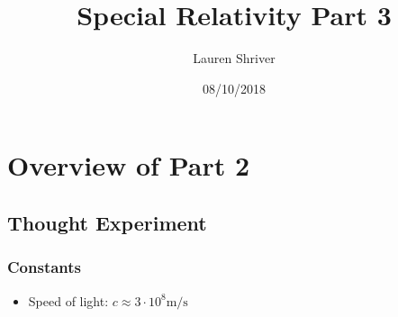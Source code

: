 \documentclass[a4paper]{article}
\title{Special Relativity Part 3}
\author{Lauren Shriver}
\date{08/10/2018}
\begin{document}
	\maketitle
	\section*{Overview of Part 2}
		\subsection*{Thought Experiment}
			\subsubsection*{Constants}
				\begin{itemize}
					\item Speed of light: $c \approx 3 \cdot 10^8 \mathrm{m/s}$  
				\end{itemize}
\end{document}
